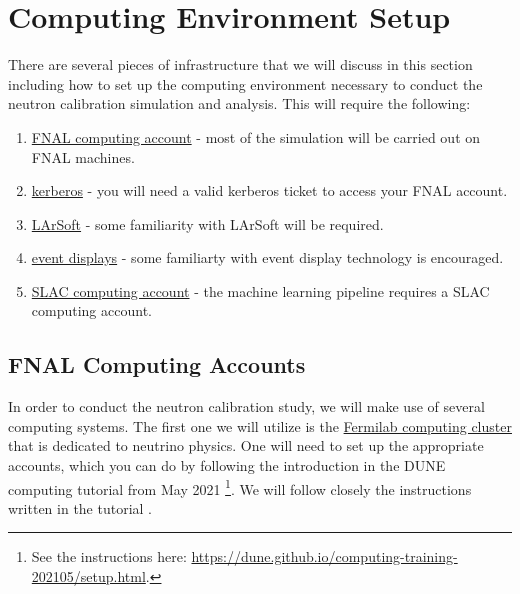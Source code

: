 \documentclass[8pt]{refart}
\begin{document}
\section{Computing Environment Setup}
There are several pieces of infrastructure that we will discuss in this section including how to set up the computing environment necessary to conduct the neutron calibration simulation and analysis.  This will require the following:
\begin{enumerate}
    \item \hyperref[fnalcomputing]{FNAL computing account} - most of the simulation will be carried out on FNAL machines.
    \item \hyperref[kerberos]{kerberos} - you will need a valid kerberos ticket to access your FNAL account.
    \item \hyperref[larsoftsetup]{LArSoft} - some familiarity with LArSoft will be required.
    \item \hyperref[eventdisplays]{event displays} - some familiarty with event display technology is encouraged.
    \item \hyperref[slaccomputing]{SLAC computing account} - the machine learning pipeline requires a SLAC computing account.
\end{enumerate}

\subsection{FNAL Computing Accounts}\label{fnalcomputing}
In order to conduct the neutron calibration study, we will make use of several computing systems.  The first one we will utilize is the \href{https://computing.fnal.gov/neutrino-muon-physics-computing/}{Fermilab computing cluster} that is dedicated to neutrino physics.  One will need to set up the appropriate accounts, which you can do by following the introduction in the DUNE computing tutorial from May 2021 \cite{DUNEComputing2021}\footnote{See the instructions here: \url{https://dune.github.io/computing-training-202105/setup.html}.}.  We will follow closely the instructions written in the tutorial \cite{DUNEComputing2021}.
\end{document}
